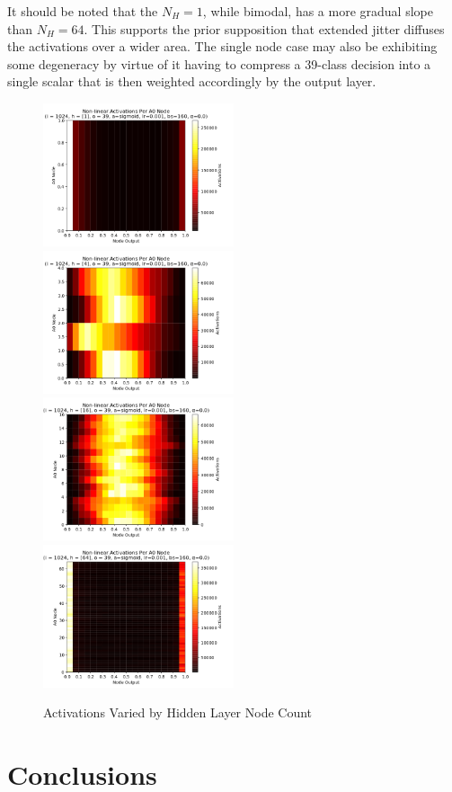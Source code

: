 \documentclass[10pt,epsf]{article}
\begin{document}
{{{      It should be noted that the $N_H = 1$, while bimodal, has a more gradual slope than $N_H = 64$.
      This supports the prior supposition that extended jitter diffuses the activations over a wider
      area. The single node case may also be exhibiting some degeneracy by virtue of it having to compress
      a 39-class decision into a single scalar that is then weighted accordingly by the output layer.
    }
    \begin{figure}[h]
      \includegraphics[width=0.5\textwidth]{./img/1-0.001-160-0-sigmoid-1/activations-A0-255.png}
      \includegraphics[width=0.5\textwidth]{./img/4-0.001-160-0-sigmoid-1/activations-A0-255.png}
      \includegraphics[width=0.5\textwidth]{./img/16-0.001-160-0-sigmoid-1/activations-A0-255.png}
      \includegraphics[width=0.5\textwidth]{./img/64-0.001-160-0-sigmoid-1/activations-A0-255.png}
      \caption{Activations Varied by Hidden Layer Node Count}
      \label{fig:a-by-nh}
    \end{figure}
  }
}
\section{Conclusions}{
}

\printbibliography
\end{document}
